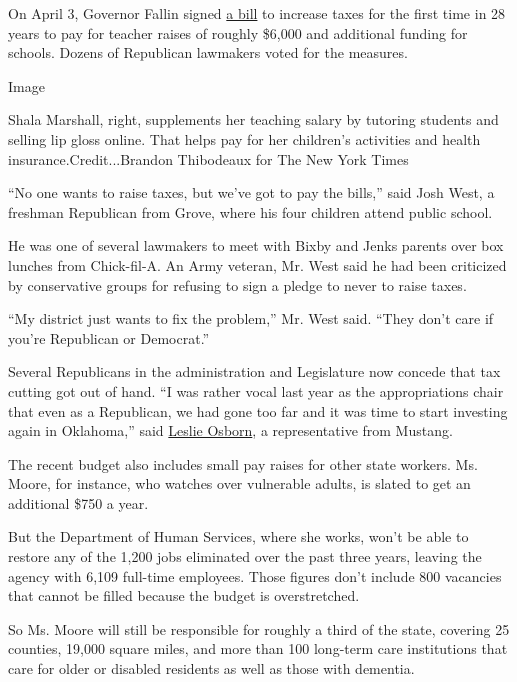 On April 3, Governor Fallin signed
\href{http://www.tulsaworld.com/news/capitol_report/fallin-signs-common-ed-budget-bills-giving-raises-to-school/article_22e39f1b-7d7e-593c-a189-f9aff8a984ab.html}{a
bill} to increase taxes for the first time in 28 years to pay for
teacher raises of roughly \$6,000 and additional funding for schools.
Dozens of Republican lawmakers voted for the measures.

Image

Shala Marshall, right, supplements her teaching salary by tutoring
students and selling lip gloss online. That helps pay for her children's
activities and health insurance.Credit...Brandon Thibodeaux for The New
York Times

``No one wants to raise taxes, but we've got to pay the bills,'' said
Josh West, a freshman Republican from Grove, where his four children
attend public school.

He was one of several lawmakers to meet with Bixby and Jenks parents
over box lunches from Chick-fil-A. An Army veteran, Mr. West said he had
been criticized by conservative groups for refusing to sign a pledge to
never to raise taxes.

``My district just wants to fix the problem,'' Mr. West said. ``They
don't care if you're Republican or Democrat.''

Several Republicans in the administration and Legislature now concede
that tax cutting got out of hand. ``I was rather vocal last year as the
appropriations chair that even as a Republican, we had gone too far and
it was time to start investing again in Oklahoma,'' said
\href{http://www.wbur.org/hereandnow/2018/03/29/oklahoma-tax-cuts}{Leslie
Osborn}, a representative from Mustang.

The recent budget also includes small pay raises for other state
workers. Ms. Moore, for instance, who watches over vulnerable adults, is
slated to get an additional \$750 a year.

But the Department of Human Services, where she works, won't be able to
restore any of the 1,200 jobs eliminated over the past three years,
leaving the agency with 6,109 full-time employees. Those figures don't
include 800 vacancies that cannot be filled because the budget is
overstretched.

So Ms. Moore will still be responsible for roughly a third of the state,
covering 25 counties, 19,000 square miles, and more than 100 long-term
care institutions that care for older or disabled residents as well as
those with dementia.

